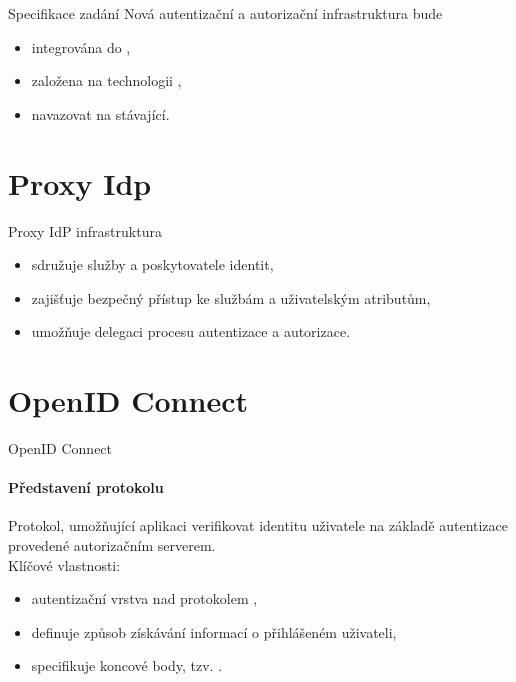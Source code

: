 \documentclass[
]{beamer}
\begin{document}
\begin{frame}{Specifikace zadání}
Nová autentizační a autorizační infrastruktura bude
\begin{itemize}
  \item integrována do ,
  \item založena na technologii , 
  \item navazovat na stávající.
\end{itemize}
\end{frame}

\section[Proxy Idp]{Proxy Idp}
\begin{frame}{Proxy IdP infrastruktura}
\begin{itemize}
    \item sdružuje služby a poskytovatele identit,
    \item zajišťuje bezpečný přístup ke službám  a uživatelským atributům,
    \item umožňuje delegaci procesu autentizace a autorizace.

\end{itemize}
\end{frame}

\section[OpenID Connect]{OpenID Connect}

\begin{frame}{OpenID Connect}
\framesubtitle{Představení protokolu}
Protokol, umožňující aplikaci verifikovat identitu uživatele na základě autentizace provedené autorizačním serverem.
\\
\medskip
Klíčové vlastnosti:
\begin{itemize}
  \item autentizační vrstva nad protokolem ,
  \item definuje způsob získávání informací o přihlášeném uživateli,
  \item specifikuje koncové body, tzv. .
\end{itemize}
\end{frame}
\end{document}

